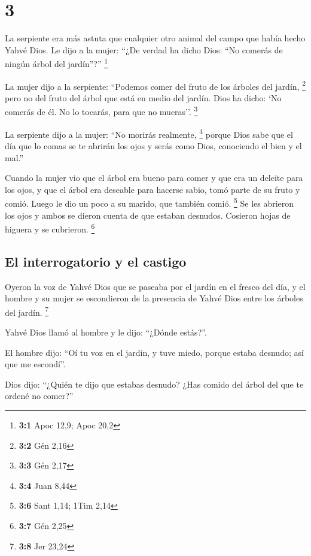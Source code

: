 \hypertarget{section-2}{%
\section{3}\label{section-2}}

 La serpiente era más astuta que cualquier otro animal del
campo que había hecho Yahvé Dios. Le dijo a la mujer: ``¿De verdad ha
dicho Dios: ``No comerás de ningún árbol del jardín''?'' \footnote{\textbf{3:1}
  Apoc 12,9; Apoc 20,2}

 La mujer dijo a la serpiente: ``Podemos comer del fruto
de los árboles del jardín, \footnote{\textbf{3:2} Gén 2,16}
 pero no del fruto del árbol que está en medio del jardín.
Dios ha dicho: `No comerás de él. No lo tocarás, para que no mueras''.
\footnote{\textbf{3:3} Gén 2,17}

 La serpiente dijo a la mujer: ``No morirás realmente,
\footnote{\textbf{3:4} Juan 8,44}  porque Dios sabe que el
día que lo comas se te abrirán los ojos y serás como Dios, conociendo el
bien y el mal.''

 Cuando la mujer vio que el árbol era bueno para comer y
que era un deleite para los ojos, y que el árbol era deseable para
hacerse sabio, tomó parte de su fruto y comió. Luego le dio un poco a su
marido, que también comió. \footnote{\textbf{3:6} Sant 1,14; 1Tim 2,14}
 Se les abrieron los ojos y ambos se dieron cuenta de que
estaban desnudos. Cosieron hojas de higuera y se cubrieron. \footnote{\textbf{3:7}
  Gén 2,25}

\hypertarget{el-interrogatorio-y-el-castigo}{%
\subsection{El interrogatorio y el
castigo}\label{el-interrogatorio-y-el-castigo}}

 Oyeron la voz de Yahvé Dios que se paseaba por el jardín
en el fresco del día, y el hombre y su mujer se escondieron de la
presencia de Yahvé Dios entre los árboles del jardín. \footnote{\textbf{3:8}
  Jer 23,24}

 Yahvé Dios llamó al hombre y le dijo: ``¿Dónde estás?''.

 El hombre dijo: ``Oí tu voz en el jardín, y tuve miedo,
porque estaba desnudo; así que me escondí''.

 Dios dijo: ``¿Quién te dijo que estabas desnudo? ¿Has
comido del árbol del que te ordené no comer?''

